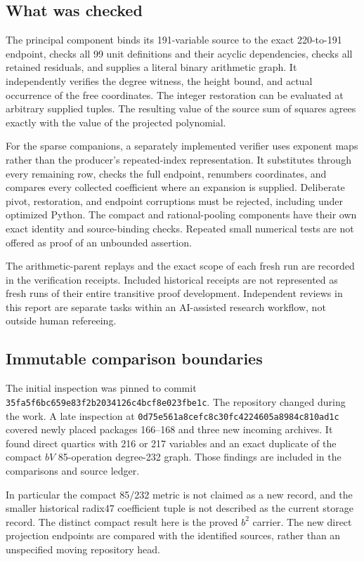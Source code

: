 \documentclass[11pt]{article}
\begin{document}
\subsection{What was checked}

The principal component binds its 191-variable source to the exact
220-to-191 endpoint, checks all 99 unit definitions and their acyclic
dependencies, checks all retained residuals, and supplies a literal
binary arithmetic graph. It independently verifies the degree witness,
the height bound, and actual occurrence of the free coordinates.
The integer restoration can be evaluated at arbitrary supplied tuples.
The resulting value of the source sum of squares agrees exactly with
the value of the projected polynomial.

For the sparse companions, a separately implemented verifier uses
exponent maps rather than the producer's repeated-index representation.
It substitutes through every remaining row, checks the full endpoint,
renumbers coordinates, and compares every collected coefficient where
an expansion is supplied. Deliberate pivot, restoration, and endpoint
corruptions must be rejected, including under optimized Python.
The compact and rational-pooling components have their own exact
identity and source-binding checks. Repeated small numerical tests
are not offered as proof of an unbounded assertion.

The arithmetic-parent replays and the exact scope of each fresh run
are recorded in the verification receipts. Included historical receipts
are not represented as fresh runs of their entire transitive proof
development. Independent reviews in this report are separate tasks
within an AI-assisted research workflow, not outside human refereeing.

\subsection{Immutable comparison boundaries}

The initial inspection was pinned to commit
\texttt{35fa5f6bc659e83f2b2034126c4bcf8e023fbe1c}.
The repository changed during the work. A late inspection at
\texttt{0d75e561a8cefc8c30fc4224605a8984c810ad1c}
covered newly placed packages 166--168 and three new incoming archives.
It found direct quartics with 216 or 217 variables and an exact duplicate
of the compact $bV$ 85-operation degree-232 graph. Those findings are
included in the comparisons and source ledger.

In particular the compact 85/232 metric is not claimed as a new record,
and the smaller historical radix47 coefficient tuple is not described
as the current storage record. The distinct compact result here is
the proved $b^2$ carrier. The new direct projection endpoints are
compared with the identified sources, rather than an unspecified
moving repository head.
\end{document}
